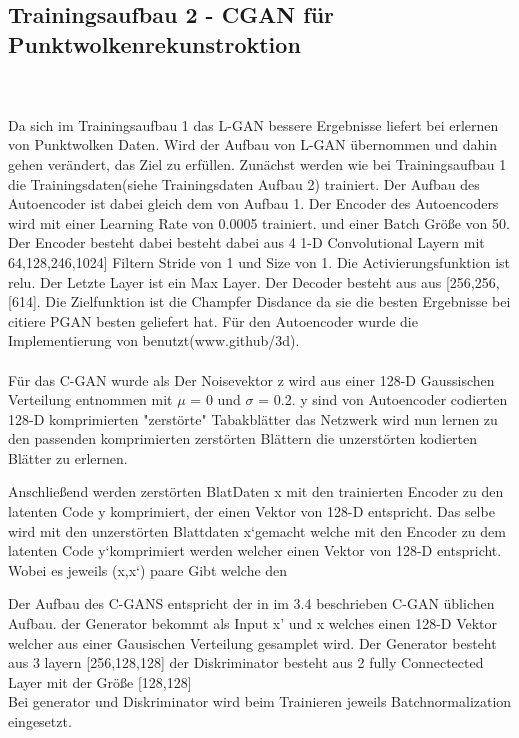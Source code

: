 \documentclass{llncs}
\begin{document}
\subsection{Trainingsaufbau 2 - CGAN für Punktwolkenrekunstroktion }\label{sec:versuch2-aufbau}
~\\\\

Da sich im Trainingsaufbau 1 das L-GAN bessere Ergebnisse liefert bei erlernen von Punktwolken Daten. Wird der Aufbau von L-GAN übernommen und dahin gehen verändert, das Ziel zu erfüllen. Zunächst werden wie bei Trainingsaufbau 1 die Trainingsdaten(siehe Trainingsdaten Aufbau 2) trainiert. Der Aufbau des Autoencoder ist dabei gleich dem von Aufbau 1. Der Encoder des Autoencoders wird mit einer Learning Rate von 0.0005 trainiert. und einer Batch Größe von 50. Der Encoder besteht dabei besteht dabei aus 4 1-D Convolutional Layern mit 64,128,246,1024] Filtern Stride von 1 und Size von 1. Die Activierungsfunktion ist relu. Der Letzte Layer ist ein Max Layer. Der Decoder besteht aus aus [256,256,[614]. Die Zielfunktion ist die Champfer Disdance  da sie die besten Ergebnisse bei citiere PGAN besten geliefert hat. Für den Autoencoder wurde die Implementierung von \cite{3dgan} benutzt(www.github/3d). 
\\\\
Für das C-GAN wurde als Der Noisevektor z wird aus einer 128-D Gaussischen Verteilung entnommen mit $\mu$ =  0 und $\sigma$ =  0.2. y sind von Autoencoder codierten 128-D komprimierten "zerstörte" Tabakblätter das Netzwerk wird nun lernen zu den passenden komprimierten zerstörten Blättern die unzerstörten kodierten Blätter zu erlernen.

Anschließend werden zerstörten BlatDaten x mit den trainierten Encoder zu den latenten Code y komprimiert, der einen Vektor von 128-D entspricht.
Das selbe wird mit den unzerstörten Blattdaten x`gemacht welche mit den Encoder zu dem latenten Code y`komprimiert werden welcher einen Vektor von 128-D entspricht. Wobei es jeweils (x,x`) paare Gibt welche den 

Der Aufbau des C-GANS entspricht der in im 3.4 beschrieben C-GAN üblichen Aufbau. der Generator bekommt als Input x' und x welches einen 128-D Vektor welcher aus einer Gausischen Verteilung gesamplet wird. Der Generator besteht aus 3 layern [256,128,128] der Diskriminator besteht aus 2 fully Connectected Layer mit der Größe [128,128]\\ Bei generator und Diskriminator wird beim Trainieren jeweils Batchnormalization eingesetzt. 
\end{document}
